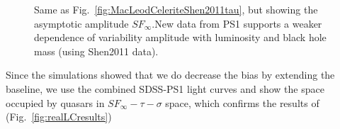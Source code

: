 \documentclass[twocolumn]{aastex62}
\begin{document}
\begin{figure*}
\caption{Same as Fig.~\ref{fig:MacLeodCeleriteShen2011tau}, but showing the asymptotic amplitude $SF_{\infty}$.New data from PS1 supports a weaker dependence of variability amplitude with luminosity and black hole mass (using Shen2011 data).  }
\label{fig:MacLeodCeleriteShen2011sf}
\end{figure*} 


Since the simulations showed that we do decrease the bias by extending the  baseline, we use the combined SDSS-PS1  light curves and show the space occupied by quasars in $SF_{\infty} - \tau - \sigma$ space, which confirms the results of \citet{macleod2011} (Fig.~\ref{fig:realLCresults})











 


\end{document}
